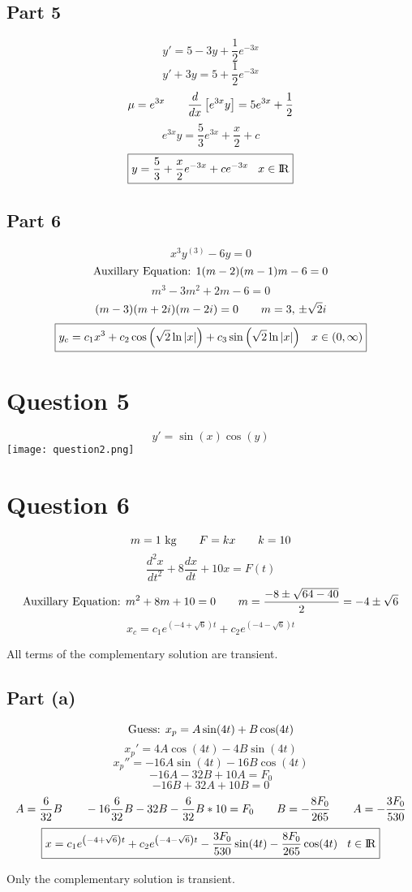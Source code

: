 \documentclass{article}
\begin{document}
\subsection*{Part 5}
\[y'=5-3y+\frac{1}{2}e^{-3x}\]
\[y'+3y=5+\frac{1}{2}e^{-3x}\]
\[\mu=e^{3x}\hspace{7 mm}\frac{d}{dx}\left[e^{3x}y\right]=5e^{3x}+\frac{1}{2}\]
\[e^{3x}y=\frac{5}{3}e^{3x}+\frac{x}{2}+c\]
\[\boxed{y=\frac{5}{3}+\frac{x}{2}e^{-3x}+ce^{-3x}\hspace{3 mm}x\in{\rm I\!R}}\]
\subsection*{Part 6}
\[x^3y^{(3)}-6y=0\]
\[\textnormal{Auxillary Equation: }1(m-2)(m-1)m-6=0\]
\[m^3-3m^2+2m-6=0\]
\[(m-3)(m+2i)(m-2i)=0\hspace{7 mm}m=3,\,\pm\sqrt{2}i\]
\[\boxed{y_c=c_1x^3+c_2\cos\left(\sqrt{2}\ln|x|\right)+c_3\sin\left(\sqrt{2}\ln|x|\right)\hspace{3 mm}x\in(0,\infty)}\]
\newpage
\section*{Question 5}
\begin{center}
\[y'=\sin(x)\cos(y)\]
\texttt{[image: question2.png]}
\end{center}
\section*{Question 6}
\[m=1 \textnormal{ kg}\hspace{7 mm}F=kx\hspace{7 mm}k=10\]
\[\frac{d^2x}{dt^2}+8\frac{dx}{dt}+10x=F(t)\]
\[\textnormal{Auxillary Equation: }m^2+8m+10=0\hspace{7 mm}m=\frac{-8\pm\sqrt{64-40}}{2}=-4\pm\sqrt{6}\]
\[x_c=c_1e^{\left(-4+\sqrt{6}\right)t}+c_2e^{\left(-4-\sqrt{6}\right)t}\]
\begin{center}
All terms of the complementary solution are transient.
\end{center}
\subsection*{Part (a)}
\[\textnormal{Guess: }x_p=A\sin(4t)+B\cos(4t)\]
\[x_p'=4A\cos(4t)-4B\sin(4t)\]
\[x_p''=-16A\sin(4t)-16B\cos(4t)\]
\[-16A-32B+10A=F_0\]
\[-16B+32A+10B=0\]
\[A=\frac{6}{32}B\hspace{7 mm}-16\frac{6}{32}B-32B-\frac{6}{32}B*10=F_0\hspace{7 mm}B=-\frac{8F_0}{265}\hspace{7 mm}A=-\frac{3F_0}{530}\]
\[\boxed{x=c_1e^{\left(-4+\sqrt{6}\right)t}+c_2e^{\left(-4-\sqrt{6}\right)t}-\frac{3F_0}{530}\sin(4t)-\frac{8F_0}{265}\cos(4t)\hspace{3 mm}t\in{\rm I\!R}}\]
\begin{center}
Only the complementary solution is transient.
\end{center}
\end{document}
